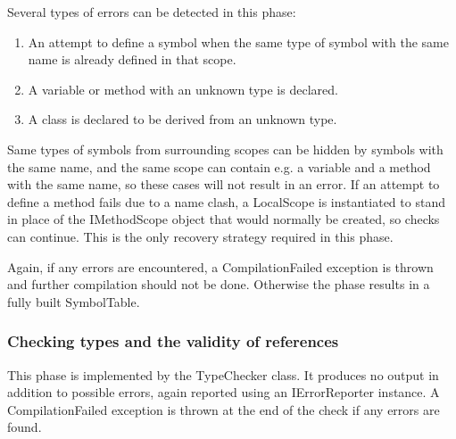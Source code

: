 \documentclass[a4paper,11pt]{article}
\begin{document}
Several types of errors can be detected in this phase:
\begin{enumerate}
\item An attempt to define a symbol when the same type of symbol with the same name is already defined in that scope.
\item A variable or method with an unknown type is declared.
\item A class is declared to be derived from an unknown type.
\end{enumerate}

Same types of symbols from surrounding scopes can be hidden by symbols with the same name, and the same scope can contain e.g. a variable and a method with the same name, so these cases will not result in an error. If an attempt to define a method fails due to a name clash, a LocalScope is instantiated to stand in place of the IMethodScope object that would normally be created, so checks can continue. This is the only recovery strategy required in this phase.

Again, if any errors are encountered, a CompilationFailed exception is thrown and further compilation should not be done. Otherwise the phase results in a fully built SymbolTable.

\subsubsection{Checking types and the validity of references}

This phase is implemented by the TypeChecker class. It produces no output in addition to possible errors, again reported using an IErrorReporter instance. A CompilationFailed exception is thrown at the end of the check if any errors are found.
\end{document}
